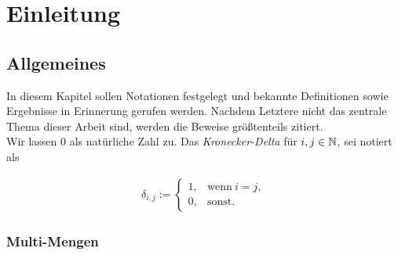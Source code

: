 \chapter{Einleitung}


    \section{Allgemeines}

        In diesem Kapitel sollen Notationen festgelegt und bekannte Definitionen sowie Ergebnisse in Erinnerung gerufen werden.
        Nachdem Letztere nicht das zentrale Thema dieser Arbeit sind, werden die Beweise größtenteils zitiert. \\

        Wir lassen $0$ als natürliche Zahl zu.
        Das \textit{Kronecker-Delta} für $i, j \in \mathbb N$, sei notiert als

        \begin{align*}
            \delta_{i, j}
            :=
            \begin{cases}
                1, & \text{wenn} ~ i = j, \\
                0, & \text{sonst}.
            \end{cases}
        \end{align*}


        \subsection{Multi-Mengen}

